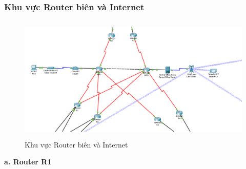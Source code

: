 \documentclass[12pt,a4paper]{report}
\begin{document}
\subsubsection{Khu vực Router biên và Internet}
\begin{figure}[H]
    \centering
    \includegraphics[width=16cm, height=6cm]{img/router.png}
    \caption{Khu vực Router biên và Internet}
    \label{hinh41}
\end{figure}
\textbf{a. Router R1} \\
\end{document}

